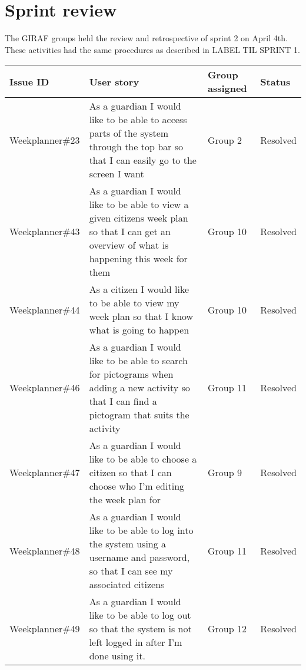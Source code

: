 \section{Sprint review}
The GIRAF groups held the review and retrospective of sprint 2 on April 4th.
These activities had the same procedures as described in LABEL TIL SPRINT 1.

\begin{longtable}{|p{2.8cm}|p{7cm}|p{1.5cm}|p{1.4cm}|}
    \hline
    Issue ID        & User story                                                                                                                                                                               & Group assigned  & Status     \\ \hline
    Weekplanner\#23 & As a guardian I would like to be able to access parts of the system through the top bar so that I can easily go to the screen I want                                                     & Group 2         & Resolved      \\ \hline
    Weekplanner\#43 & As a guardian I would like to be able to view a given citizens week plan so that I can get an overview of what is happening this week for them                                           & Group 10        & Resolved      \\ \hline
    Weekplanner\#44 & As a citizen I would like to be able to view my week plan so that I know what is going to happen                                                                                         & Group 10        & Resolved     \\ \hline
    Weekplanner\#46 & As a guardian I would like to be able to search for pictograms when adding a new activity so that I can find a pictogram that suits the activity                                         & Group 11        & Resolved   \\ \hline
    Weekplanner\#47 & As a guardian I would like to be able to choose a citizen so that I can choose who I’m editing the week plan for                                                                         & Group 9         & Resolved   \\ \hline
    Weekplanner\#48 & As a guardian I would like to be able to log into the system using a username and password, so that I can see my associated citizens                                                     & Group 11        & Resolved  \\ \hline
    Weekplanner\#49 & As a guardian I would like to be able to log out so that the system is not left logged in after I’m done using it.                                                                       & Group 12        & Resolved     \\ \hline

\end{longtable}
